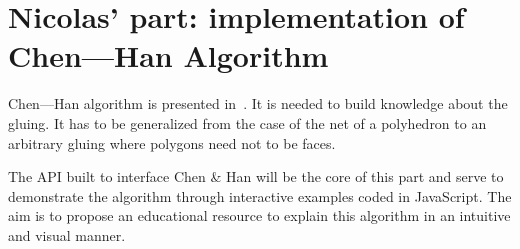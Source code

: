 \section{Nicolas' part: implementation of Chen—Han Algorithm}
Chen—Han algorithm is presented in~\cite{chen-han}. It is needed to build knowledge about the gluing. It has to be generalized from the case of the net of a polyhedron to an arbitrary gluing where polygons need not to be faces.\par
The API built to interface Chen \& Han will be the core of this part and serve to demonstrate the algorithm through interactive examples coded in JavaScript. The aim is to propose an educational resource to explain this algorithm in an intuitive and visual manner.\par
